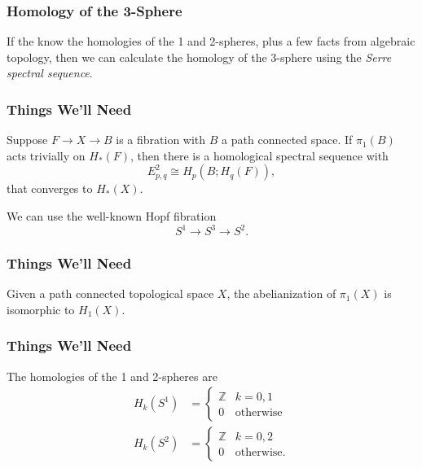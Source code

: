 \documentclass{beamer}
\begin{document}
\begin{frame}
	\frametitle{Homology of the 3-Sphere}

	If the know the homologies of the 1 and 2-spheres, plus a few facts from algebraic topology, then we can calculate the homology of the 3-sphere using the \textit{Serre spectral sequence}.
\end{frame}

\begin{frame}
	\frametitle{Things We'll Need}

	\begin{theorem}
                 Suppose $F\to X\to B$ is a fibration with $B$ a path connected space. If $\pi_1(B)$ acts trivially on $H_{*}(F)$, then there is a homological spectral sequence with
                 \[
                         E_{p,q}^{2}\cong H_{p}(B;H_{q}(F)),
                 \]
		 that converges to $H_{*}(X)$.
        \end{theorem}
	We can use the well-known Hopf fibration
	\[
		S^{1}\to S^{3} \to S^{2}.
	\] 
\end{frame}

\begin{frame}
	\frametitle{Things We'll Need}

	\begin{theorem}[Hurewicz]
		Given a path connected topological space $X$, the abelianization of $\pi_1(X)$ is isomorphic to $H_{1}(X)$.
	\end{theorem}
\end{frame}

\begin{frame}
	\frametitle{Things We'll Need}

	The homologies of the 1 and 2-spheres are
	\begin{align*}
		H_{k}(S^{1}) &=
                \begin{cases}
                        \mathbb{Z}&k=0,1\\
                        0&\text{otherwise}
                \end{cases}\\
                H_{k}(S^{2}) &=
                \begin{cases}
                        \mathbb{Z}&k=0,2\\
                        0&\text{otherwise}.
                \end{cases}
	\end{align*}
\end{frame}
\end{document}
